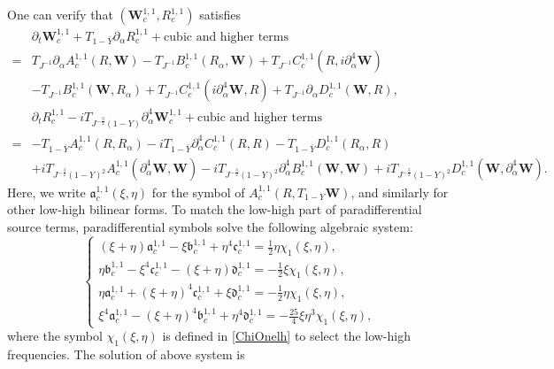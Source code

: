 \documentclass[10pt]{amsart}
\theoremstyle{remark}
\theoremstyle{definition}
\numberwithin{equation}{section}
\newcommand{\p}{\partial}
\newcommand{\al}{\alpha}
\newcommand{\f}{\frac}
\newcommand{\bw}{\mathbf{W}}
\begin{document}
One can verify that
$(\bw^{1,1}_{c}, R^{1,1}_{c})$ satisfies
\begin{align*}
 &\p_t \bw^{1,1}_c+T_{1-\bar{Y}}\p_\al R^{1,1}_c  + \text{cubic and higher terms} \\
=& T_{J^{-1}}\partial_\alpha A^{1,1}_c(R, \bw) -T_{J^{-1}}B^{1,1}_{c}(R_\alpha, \bw) +  T_{J^{-1}}C^{1,1}_{c}(R, i\p_\al^4\bw) \\
 &-T_{J^{-1}}B^{1,1}_{c}(\bw, R_\alpha)+ T_{J^{-1}}C^{1,1}_{c}(i\p_\al^4\bw, R) + T_{J^{-1}}\partial_\alpha D^{1,1}_{c}(\bw, R),\\
&\p_t R^{1,1}_c-iT_{J^{-\f32}(1-Y)}\p_\al^4\bw^{1,1}_c+ \text{cubic and higher  terms} \\
=& -T_{1-\bar{Y}}A^{1,1}_{c}(R, R_\alpha) - iT_{1-\bar{Y}}\partial_\alpha^4 C^{1,1}_{c}(R, R) - T_{1-\bar{Y}}D^{1,1}_{c}(R_\alpha, R)\\
&+iT_{J^{-\f32}(1-Y)^2}A^{1,1}_{c}(\p_\al^4\bw, \bw) -iT_{J^{-\f32}(1-Y)^2}\partial_\alpha^4 B^{1,1}_{c}(\bw, \bw) +iT_{J^{-\f32}(1-Y)^2}D^{1,1}_{c}(\bw, \p_\al^4\bw).
\end{align*}
Here, we write $\mathfrak{a}^{1,1}_{c}(\xi, \eta)$ for the symbol of $A^{1,1}_{c}(R, T_{1-Y}\bw)$, and similarly for other low-high bilinear forms.
To match the low-high part of paradifferential source terms, paradifferential symbols solve the following algebraic system: 
\begin{equation*}
\begin{cases}
(\xi + \eta)\mathfrak{a}^{1,1}_{c}-\xi\mathfrak{b}^{1,1}_{c}+\eta^4\mathfrak{c}^{1,1}_{c}= \f12 \eta\chi_1(\xi, \eta),\\
\eta\mathfrak{b}^{1,1}_{c}-\xi^4\mathfrak{c}^{1,1}_{c}-(\xi+\eta)\mathfrak{d}^{1,1}_{c}=-\f12 \xi\chi_{1}(\xi,\eta),\\
\eta\mathfrak{a}^{1,1}_{c}+(\xi+\eta)^4\mathfrak{c}^{1,1}_{c}+\xi\mathfrak{d}^{1,1}_{c}=-\f12\eta\chi_{1}(\xi,\eta),\\
\xi^4 \mathfrak{a}^{1,1}_{c}-(\xi+\eta)^4\mathfrak{b}^{1,1}_{c}+\eta^4\mathfrak{d}^{1,1}_{c}=-\f{25}{4}\xi\eta^3\chi_{1}(\xi,\eta),
\end{cases}
\end{equation*}
where  the symbol $\chi_{1}(\xi, \eta)$ is defined in \eqref{ChiOnelh} to select the low-high frequencies.
The solution of above system is 
\end{document}
